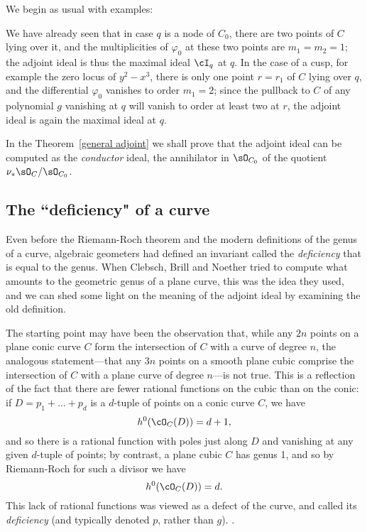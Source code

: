 We begin as usual with examples:

\begin{example}
We have already seen that in case $q$ is a node of $C_0$, there are two points of $C$ lying over it, and the multiplicities of $\varphi_0$ at these two points are $m_1=m_2=1$; the adjoint ideal is thus 
 the maximal ideal $\cI_q$ at $q$. In the case of a cusp, for example the zero locus of $y^2-x^3$, there is only one point $r=r_1$ of $C$ lying over $q$, and the differential $\varphi_0$ vanishes to order $m_1=2$; since the pullback to $C$ of any polynomial $g$ vanishing at $q$ will vanish to order at least two at $r$, the adjoint ideal is again the maximal ideal at $q$.
\end{example}

In the Theorem~\ref{general adjoint} we shall prove that the adjoint ideal can be computed
as the \emph{conductor} ideal, the annihilator in $\sO_{C_0}$ of the quotient
$\nu_*\sO_C/\sO_{C_0}$.

\subsection{The ``deficiency" of a curve}

Even before the Riemann-Roch theorem and the modern definitions of the genus of a curve, algebraic geometers had
defined an invariant called the \emph{deficiency} that is equal to the genus. When Clebsch, Brill and Noether tried to 
compute what amounts to the geometric genus of a plane curve, this was the idea they used, and we can shed some light
on the meaning of the adjoint ideal by examining the old definition.

The starting point may have been the observation that, while any $2n$ points on a plane conic curve $C$ form the intersection of $C$ with a  curve of degree $n$, the analogous statement---that any $3n$ points on a smooth plane cubic comprise the intersection of $C$ with a plane curve of degree $n$---is not true. This is a reflection of the fact that there are fewer rational functions on the cubic than on the conic: if $D = p_1+\dots + p_d$ is a $d$-tuple of points on a conic curve $C$, we have
$$
h^0(\cO_C(D)) = d+1,
$$ 
and so there is a rational function with poles just along $D$ and vanishing at any given $d$-tuple of points; by contrast, a plane cubic $C$ has genus 1, and so by Riemann-Roch for such a divisor we have
$$
h^0(\cO_C(D)) = d.
$$
This lack of rational functions was viewed as a defect of the curve, and called its \emph{deficiency} (and typically denoted $p$, rather than $g$). .

